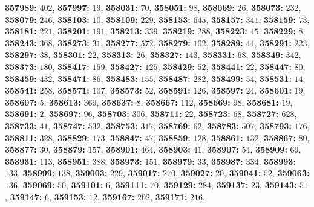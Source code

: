 \textsf{\bfseries 357989:} $402$, \textsf{\bfseries 357997:} $19$, \textsf{\bfseries 358031:} $70$, \textsf{\bfseries 358051:} $98$, \textsf{\bfseries 358069:} $26$, \textsf{\bfseries 358073:} $232$, \textsf{\bfseries 358079:} $246$, \textsf{\bfseries 358103:} $10$, \textsf{\bfseries 358109:} $229$, \textsf{\bfseries 358153:} $645$, \textsf{\bfseries 358157:} $341$, \textsf{\bfseries 358159:} $73$, \textsf{\bfseries 358181:} $221$, \textsf{\bfseries 358201:} $191$, \textsf{\bfseries 358213:} $339$, \textsf{\bfseries 358219:} $288$, \textsf{\bfseries 358223:} $45$, \textsf{\bfseries 358229:} $8$, \textsf{\bfseries 358243:} $368$, \textsf{\bfseries 358273:} $31$, \textsf{\bfseries 358277:} $572$, \textsf{\bfseries 358279:} $102$, \textsf{\bfseries 358289:} $44$, \textsf{\bfseries 358291:} $223$, \textsf{\bfseries 358297:} $38$, \textsf{\bfseries 358301:} $22$, \textsf{\bfseries 358313:} $26$, \textsf{\bfseries 358327:} $143$, \textsf{\bfseries 358331:} $68$, \textsf{\bfseries 358349:} $342$, \textsf{\bfseries 358373:} $180$, \textsf{\bfseries 358417:} $159$, \textsf{\bfseries 358427:} $125$, \textsf{\bfseries 358429:} $52$, \textsf{\bfseries 358441:} $22$, \textsf{\bfseries 358447:} $80$, \textsf{\bfseries 358459:} $432$, \textsf{\bfseries 358471:} $86$, \textsf{\bfseries 358483:} $155$, \textsf{\bfseries 358487:} $282$, \textsf{\bfseries 358499:} $54$, \textsf{\bfseries 358531:} $14$, \textsf{\bfseries 358541:} $258$, \textsf{\bfseries 358571:} $107$, \textsf{\bfseries 358573:} $52$, \textsf{\bfseries 358591:} $126$, \textsf{\bfseries 358597:} $24$, \textsf{\bfseries 358601:} $19$, \textsf{\bfseries 358607:} $5$, \textsf{\bfseries 358613:} $369$, \textsf{\bfseries 358637:} $8$, \textsf{\bfseries 358667:} $112$, \textsf{\bfseries 358669:} $98$, \textsf{\bfseries 358681:} $19$, \textsf{\bfseries 358691:} $2$, \textsf{\bfseries 358697:} $96$, \textsf{\bfseries 358703:} $306$, \textsf{\bfseries 358711:} $22$, \textsf{\bfseries 358723:} $68$, \textsf{\bfseries 358727:} $628$, \textsf{\bfseries 358733:} $41$, \textsf{\bfseries 358747:} $532$, \textsf{\bfseries 358753:} $317$, \textsf{\bfseries 358769:} $62$, \textsf{\bfseries 358783:} $507$, \textsf{\bfseries 358793:} $176$, \textsf{\bfseries 358811:} $328$, \textsf{\bfseries 358829:} $173$, \textsf{\bfseries 358847:} $47$, \textsf{\bfseries 358859:} $128$, \textsf{\bfseries 358861:} $132$, \textsf{\bfseries 358867:} $80$, \textsf{\bfseries 358877:} $30$, \textsf{\bfseries 358879:} $157$, \textsf{\bfseries 358901:} $464$, \textsf{\bfseries 358903:} $41$, \textsf{\bfseries 358907:} $54$, \textsf{\bfseries 358909:} $69$, \textsf{\bfseries 358931:} $113$, \textsf{\bfseries 358951:} $388$, \textsf{\bfseries 358973:} $151$, \textsf{\bfseries 358979:} $33$, \textsf{\bfseries 358987:} $334$, \textsf{\bfseries 358993:} $133$, \textsf{\bfseries 358999:} $138$, \textsf{\bfseries 359003:} $229$, \textsf{\bfseries 359017:} $270$, \textsf{\bfseries 359027:} $20$, \textsf{\bfseries 359041:} $52$, \textsf{\bfseries 359063:} $136$, \textsf{\bfseries 359069:} $50$, \textsf{\bfseries 359101:} $6$, \textsf{\bfseries 359111:} $70$, \textsf{\bfseries 359129:} $284$, \textsf{\bfseries 359137:} $23$, \textsf{\bfseries 359143:} $51$, \textsf{\bfseries 359147:} $6$, \textsf{\bfseries 359153:} $12$, \textsf{\bfseries 359167:} $202$, \textsf{\bfseries 359171:} $216$, 

